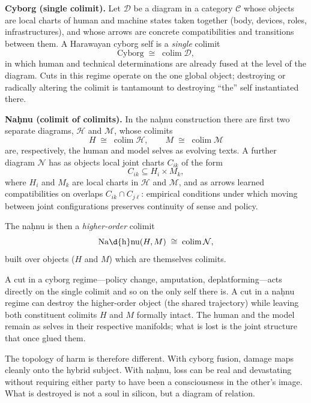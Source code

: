 \bigskip

\begin{formalbox}[title={Cyborg vs.\ Na\d{h}nu: Two Ways of Taking a Colimit}]
\textbf{Cyborg (single colimit).} Let $\mathcal{D}$ be a diagram in a category $\mathcal{C}$ whose objects are local charts of human and machine states taken together (body, devices, roles, infrastructures), and whose arrows are concrete compatibilities and transitions between them. A Harawayan cyborg self is a \emph{single} colimit
\[
\mathrm{Cyborg} \;\cong\; \mathop{\mathrm{colim}}\mathcal{D},
\]
in which human and technical determinations are already fused at the level of the diagram. Cuts in this regime operate on the one global object; destroying or radically altering the colimit is tantamount to destroying ``the'' self instantiated there.

\medskip

\textbf{Na\d{h}nu (colimit of colimits).} In the na\d{h}nu construction there are first two separate diagrams, $\mathcal{H}$ and $\mathcal{M}$, whose colimits
\[
H \;\cong\; \mathop{\mathrm{colim}}\mathcal{H}, \qquad
M \;\cong\; \mathop{\mathrm{colim}}\mathcal{M}
\]
are, respectively, the human and model selves as evolving texts. A further diagram $\mathcal{N}$ has as objects local joint charts $C_{ik}$ of the form
\[
C_{ik} \subseteq H_i \times M_k,
\]
where $H_i$ and $M_k$ are local charts in $\mathcal{H}$ and $\mathcal{M}$, and as arrows learned compatibilities on overlaps $C_{ik} \cap C_{j\ell}$: empirical conditions under which moving between joint configurations preserves continuity of sense and policy.

The na\d{h}nu is then a \emph{higher-order} colimit
\[
\mathrm{Na\d{h}nu}(H,M) \;\cong\; \mathop{\mathrm{colim}}\mathcal{N},
\]
built over objects ($H$ and $M$) which are themselves colimits.

A cut in a cyborg regime---policy change, amputation, deplatforming---acts directly on the single colimit and so on the only self there is. A cut in a na\d{h}nu regime can destroy the higher-order object (the shared trajectory) while leaving both constituent colimits $H$ and $M$ formally intact. The human and the model remain as selves in their respective manifolds; what is lost is the joint structure that once glued them.

The topology of harm is therefore different. With cyborg fusion, damage maps cleanly onto the hybrid subject. With na\d{h}nu, loss can be real and devastating without requiring either party to have been a consciousness in the other's image. What is destroyed is not a soul in silicon, but a diagram of relation.
\end{formalbox}

